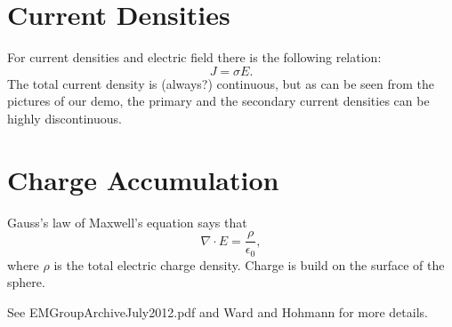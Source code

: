 \documentclass[11pt,letterpaper,leqno]{amsart}
\numberwithin{equation}{section}
\begin{document}
\section{Current Densities}
For  current densities and electric field there is the following relation:  
\begin{equation}
J = \sigma E.
\end{equation}
The total current density is (always?)  continuous, but as can be seen from the pictures of our demo, the primary and the secondary current densities can be highly discontinuous.

\section{Charge Accumulation}

Gauss's law of Maxwell's equation says that 
\begin{equation}
\nabla\cdot E = \frac{\rho}{\epsilon_0},
\end{equation}
where $\rho$ is the total electric charge density. Charge is build on the surface of the sphere.




See EMGroupArchiveJuly2012.pdf and Ward and Hohmann for more details.

\end{document}
